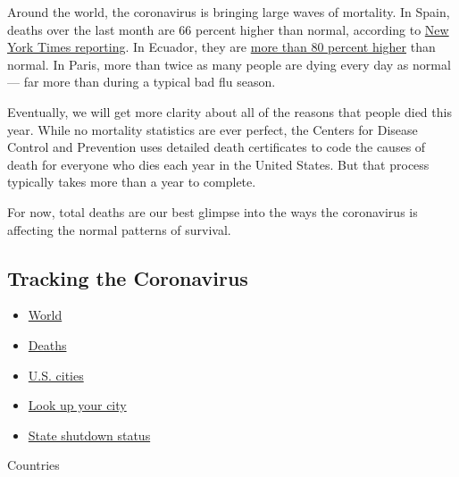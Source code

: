 Around the world, the coronavirus is bringing large waves of mortality.
In Spain, deaths over the last month are 66 percent higher than normal,
according to
\href{https://www.nytimes.com/interactive/2020/04/21/world/coronavirus-missing-deaths.html}{New
York Times reporting}. In Ecuador, they are
\href{https://www.nytimes.com/2020/04/23/world/americas/ecuador-deaths-coronavirus.html}{more
than 80 percent higher} than normal. In Paris, more than twice as many
people are dying every day as normal --- far more than during a typical
bad flu season.

Eventually, we will get more clarity about all of the reasons that
people died this year. While no mortality statistics are ever perfect,
the Centers for Disease Control and Prevention uses detailed death
certificates to code the causes of death for everyone who dies each year
in the United States. But that process typically takes more than a year
to complete.

For now, total deaths are our best glimpse into the ways the coronavirus
is affecting the normal patterns of survival.

\hypertarget{tracking-the-coronavirus}{%
\subsection{Tracking the Coronavirus}\label{tracking-the-coronavirus}}

\begin{itemize}
\tightlist
\item
  \href{https://www.nytimes.com/interactive/2020/world/coronavirus-maps.html}{World}
\item
  \href{https://www.nytimes.com/interactive/2020/03/21/upshot/coronavirus-deaths-by-country.html}{Deaths}
\item
  \href{https://www.nytimes.com/interactive/2020/04/03/upshot/coronavirus-metro-area-tracker.html}{U.S.
  cities}
\item
  \href{https://www.nytimes.com/interactive/2020/04/23/upshot/five-ways-to-monitor-coronavirus-outbreak-us.html}{Look
  up your city}
\item
  \href{https://www.nytimes.com/interactive/2020/us/states-reopen-map-coronavirus.html}{State
  shutdown status}
\end{itemize}

Countries

